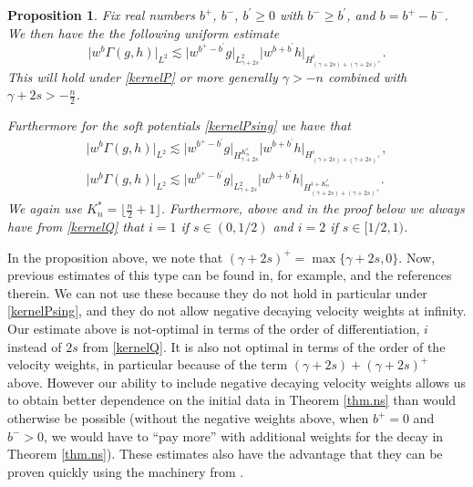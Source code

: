 \documentclass{amsart}
\newtheorem{proposition}{Proposition}[section]
\numberwithin{equation}{section}
\begin{document}
\begin{proposition}\label{lem.h1h2}
Fix real numbers ${b}^+$, ${b}^-$, ${b}^\prime \ge 0$ with ${b}^-\ge  {b}^\prime$, and ${b}={b}^+- {b}^-$.
We then have the the following uniform estimate 
\begin{equation}
{|} w^{b}{\Gamma}(g,h){|}_{L^2} \lesssim 
{|} w^{ {b}^+ - {b}^\prime} g{|}_{L^2_{\gamma  + 2s}}  
{|} w^{ {b} + {b}^\prime} h{|}_{H^{i}_{(\gamma+2s)+(\gamma+2s)^+}}.
\label{lem.est.g1}
\end{equation}
This will hold under \eqref{kernelP} or more generally $\gamma > -{n}$ combined with $\gamma+2s > -\frac{n}{2}$.

Furthermore for the soft potentials \eqref{kernelPsing} we have that  
\begin{equation}
\label{lem.est.g2}
\begin{split}
{|} w^{b} \Gamma(g,h){|}_{L^2} \lesssim 
{|} w^{ {b}^+ - {b}^\prime} g{|}_{H^{K^*_n}_{\gamma  + 2s}}  
{|} w^{ {b} + {b}^\prime}  h{|}_{H^{i}_{(\gamma+2s)+(\gamma+2s)^+}},
\\
{|} w^{b} \Gamma(g,h){|}_{L^2}
\lesssim 
{|} w^{ {b}^+ - {b}^\prime} g{|}_{L^{2}_{\gamma  + 2s}}  
{|} w^{ {b} + {b}^\prime}  h{|}_{H^{{i}+{K^*_n}}_{(\gamma+2s)+(\gamma+2s)^+}}.
\end{split}
\end{equation}
We again use ${K^*_n} = \lfloor \frac{n}{2} +1 \rfloor$.  Furthermore, above and in the proof below we always have from \eqref{kernelQ} that ${i}=1$ if $s\in(0,1/2)$ and ${i}=2$ if $s\in [1/2,1)$.
\end{proposition}

In the proposition above, we note that $(\gamma+2s)^+ = \max\{ \gamma+2s, 0\}$.  Now, previous estimates of this type can be found in, for example, \cite{ChenHeSmoothing,MR2847536} and the references therein.  
We can not use these because they do not hold in particular under \eqref{kernelPsing}, and they do not allow negative decaying velocity weights at infinity.  
Our estimate above is not-optimal in terms of the order of differentiation, ${i}$ instead of $2s$ from \eqref{kernelQ}.  It is also not optimal in terms of the order of the velocity weights, in particular because of the term $(\gamma+2s)+(\gamma+2s)^+$ above.  
However our ability to include negative decaying velocity weights allows us to obtain better dependence on the initial data in Theorem \ref{thm.ns} than would otherwise be possible (without the negative weights above, when ${b}^+ =0$ and ${b}^- > 0$, we would have to ``pay more'' with additional weights  for the decay in Theorem \ref{thm.ns}).  These estimates also have the advantage that they can be proven quickly using the machinery from \cite{gsNonCut0}. 
\end{document}
